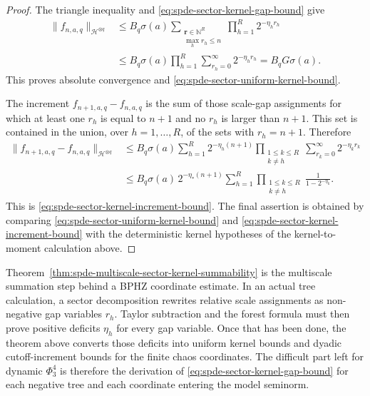 \begin{proof}
The triangle inequality and
\eqref{eq:spde-sector-kernel-gap-bound} give
\[
\begin{aligned}
  \|f_{n,a,q}\|_{\mathcal H^{\otimes q}}
  &\leq
  B_q\sigma(a)
  \sum_{\substack{\mathbf r\in\mathbb N^R\\ \max_h r_h\leq n}}
  \prod_{h=1}^R2^{-\eta_h r_h}        \\
  &\leq
  B_q\sigma(a)
  \prod_{h=1}^R
  \sum_{r_h=0}^{\infty}2^{-\eta_h r_h}
  =
  B_qG\sigma(a).
\end{aligned}
\]
This proves absolute convergence and
\eqref{eq:spde-sector-uniform-kernel-bound}.

The increment \(f_{n+1,a,q}-f_{n,a,q}\) is the sum of those scale-gap
assignments for which at least one \(r_h\) is equal to \(n+1\) and no
\(r_h\) is larger than \(n+1\).  This set is contained in the union, over
\(h=1,\ldots,R\), of the sets with \(r_h=n+1\).  Therefore
\[
\begin{aligned}
  \|f_{n+1,a,q}-f_{n,a,q}\|_{\mathcal H^{\otimes q}}
  &\leq
  B_q\sigma(a)
  \sum_{h=1}^R
  2^{-\eta_h(n+1)}
  \prod_{\substack{1\leq k\leq R\\k\neq h}}
  \sum_{r_k=0}^{\infty}2^{-\eta_k r_k}        \\
  &\leq
  B_q\sigma(a)\,2^{-\eta_*(n+1)}
  \sum_{h=1}^R
  \prod_{\substack{1\leq k\leq R\\k\neq h}}
  \frac{1}{1-2^{-\eta_k}} .
\end{aligned}
\]
This is \eqref{eq:spde-sector-kernel-increment-bound}.  The final assertion
is obtained by comparing
\eqref{eq:spde-sector-uniform-kernel-bound} and
\eqref{eq:spde-sector-kernel-increment-bound} with the deterministic kernel
hypotheses of
the kernel-to-moment calculation above.
\end{proof}

Theorem~\ref{thm:spde-multiscale-sector-kernel-summability} is the
multiscale summation step behind a BPHZ coordinate estimate.  In an actual
tree calculation, a sector decomposition rewrites relative scale assignments
as non-negative gap variables \(r_h\).  Taylor subtraction and the forest
formula must then prove positive deficits \(\eta_h\) for every gap variable.
Once that has been done, the theorem above converts those deficits into
uniform kernel bounds and dyadic cutoff-increment bounds for the finite
chaos coordinates.  The difficult part left for dynamic \(\Phi^4_3\) is
therefore the derivation of
\eqref{eq:spde-sector-kernel-gap-bound} for each negative tree and each
coordinate entering the model seminorm.

